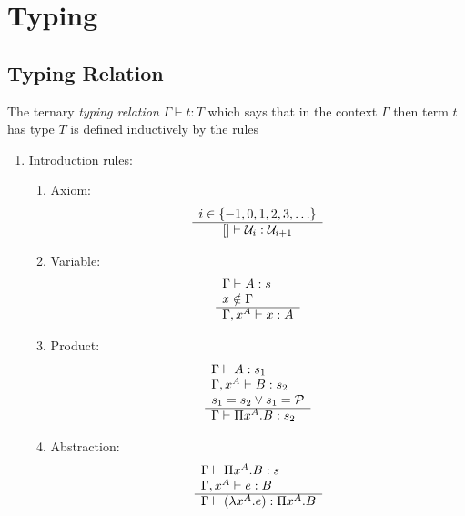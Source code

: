 \section{Typing}









\subsection{Typing Relation}


\begin{definition}
The ternary \emph{typing relation} $\Gamma \vdash t: T$ which says that in
the context $\Gamma$ then term $t$ has type $T$ is defined inductively by
the rules
\begin{enumerate}
    \item Introduction rules:
    \begin{enumerate}
        \item Axiom:
            $$
            \begin{array}{c} i \in \{-1, 0, 1, 2, 3, \ldots \} \\ \hline  [] \vdash {\cal U}_i : {\cal U}_{i + 1}\end{array}
            $$

        \item Variable:
            $$
            \begin{array}{l} 
                \Gamma \vdash A: s
                \\
                x \notin \Gamma
             \\ \hline 
                \Gamma, x^A \vdash x: A
            \end{array}
            $$

        \item Product:
            $$
            \begin{array}{l} 
                \Gamma \vdash A: s_1
                \\
                \Gamma, x^A \vdash B: s_2
                \\
                s_1 = s_2 \lor s_1 = {\cal P}
             \\ \hline 
                \Gamma \vdash \Pi x^A.B : s_2
            \end{array}
            $$

        \item Abstraction:
            $$
            \begin{array}{l} 
                \Gamma \vdash \Pi x^A. B: s
                \\
                \Gamma, x^A \vdash e: B
             \\ \hline 
                \Gamma \vdash (\lambda x^A. e): \Pi x^A. B
            \end{array}
            $$


\end{enumerate}
\end{enumerate}
\end{definition}
